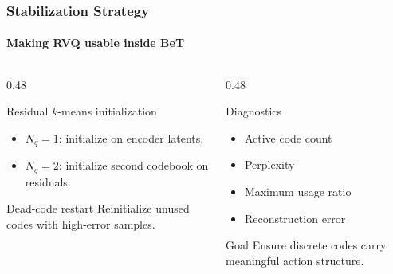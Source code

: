 \documentclass[aspectratio=169]{ctexbeamer}
\begin{document}
\begin{frame}
  \frametitle{Stabilization Strategy}
  \framesubtitle{Making RVQ usable inside BeT}
  \begin{columns}[T]
    \begin{column}{0.48\textwidth}
      \begin{block}{Residual $k$-means initialization}
        \begin{itemize}
          \item $N_q=1$: initialize on encoder latents.
          \item $N_q=2$: initialize second codebook on residuals.
        \end{itemize}
      \end{block}
      \begin{block}{Dead-code restart}
        Reinitialize unused codes with high-error samples.
      \end{block}
    \end{column}
    \begin{column}{0.48\textwidth}
      \begin{block}{Diagnostics}
        \begin{itemize}
          \item Active code count
          \item Perplexity
          \item Maximum usage ratio
          \item Reconstruction error
        \end{itemize}
      \end{block}
      \begin{block}{Goal}
        Ensure discrete codes carry meaningful action structure.
      \end{block}
    \end{column}
  \end{columns}
\end{frame}
\end{document}
